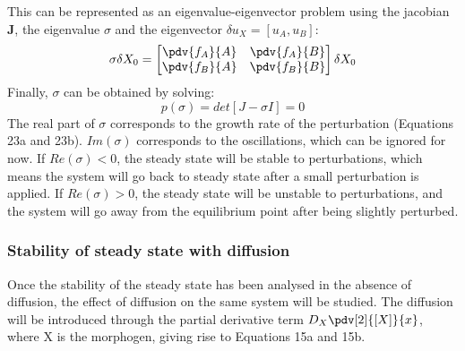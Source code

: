 This can be represented as an eigenvalue-eigenvector problem using the jacobian $\textbf{J}$, the eigenvalue $\sigma$ and the eigenvector  $\delta u_{X} = [u_{A},u_{B}]$:
\begin{equation}
    \sigma \delta X_{0} = \begin{bmatrix}
                              \pdv{f_{A}}{A} &
                              \pdv{f_{A}}{B}  \\
                              \pdv{f_{B}}{A} &
                              \pdv{f_{B}}{B}
    \end{bmatrix}\delta X_{0}
\end{equation}
Finally, $\sigma$ can be obtained by solving:
\begin{equation}
    p(\sigma) = det[J-\sigma I] = 0
\end{equation}
The real part of $\sigma$ corresponds to the growth rate of the perturbation (Equations 23a and 23b). $Im(\sigma)$ corresponds to the oscillations, which can be ignored for now. If $Re(\sigma) < 0 $, the steady state will be stable to perturbations, which means the system will go back to steady state after a small perturbation is applied. If $Re(\sigma) > 0 $, the steady state will be unstable to perturbations, and the system will go away from the equilibrium point after being slightly perturbed.
\subsubsection{Stability of steady state with diffusion}
Once the stability of the steady state has been analysed in the absence of diffusion, the effect of diffusion on the same system will be studied. The diffusion will be introduced through the partial derivative term $D_{X}\pdv[2]{[X]}{x}$, where X is the morphogen, giving rise to Equations 15a and 15b.
